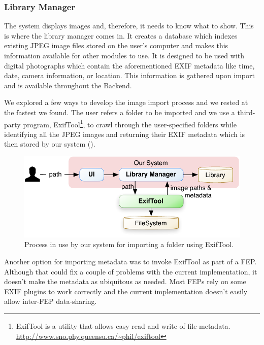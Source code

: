 \subsubsection{Library Manager} %
\label{ssub:library_manager}

The system displays images and, therefore, it needs to know what to show. This is where the library manager comes in. It creates a database which indexes existing JPEG image files stored on the user's computer and makes this information available for other modules to use. It is designed to be used with digital photographs which contain the aforementioned EXIF metadata like time, date, camera information, or location. This information is gathered upon import and is available throughout the Backend.

We explored a few ways to develop the image import process and we rested at the fastest we found. The user refers a folder to be imported and we use a third-party program, ExifTool\footnote{ExifTool is a utility that allows easy read and write of file metadata. \url{http://www.sno.phy.queensu.ca/~phil/exiftool}}, to crawl through the user-specified folders while identifying all the JPEG images and returning their \ac{EXIF} metadata which is then stored by our system ().

\begin{figure}[ht]
	\centering
		\includegraphics[scale=0.6]{Figures/import.pdf}
	\caption{Process in use by our system for importing a folder using ExifTool.}
	\label{fig:arch:import}
\end{figure}


Another option for importing metadata was to invoke ExifTool as part of a \ac{FEP}. Although that could fix a couple of problems with the current  implementation, it doesn’t make the metadata as ubiquitous as needed. Most \acp{FEP} rely on some \ac{EXIF} plugins to work correctly and the current implementation doesn’t easily allow inter-\ac{FEP} data-sharing.





